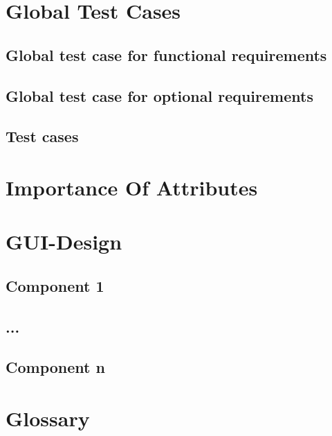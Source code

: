 \documentclass[10pt,a4paper]{report}
\begin{document}
\chapter{Global Test Cases}
\section{Global test case for functional requirements}
\section{Global test case for optional requirements}
\section{Test cases}
\chapter{Importance Of Attributes}

\chapter{GUI-Design}
\section{Component 1}
\section{...}
\section{Component n}

\chapter{Glossary}
\end{document}
